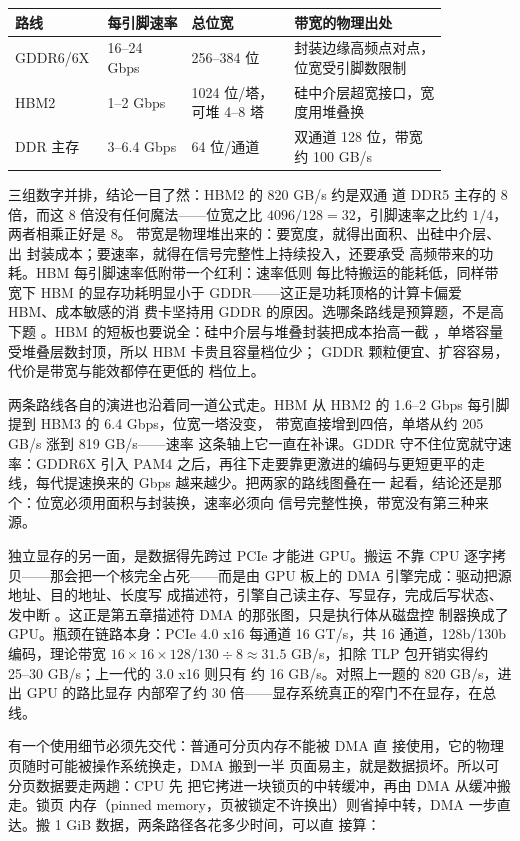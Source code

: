 \begin{longtable}{L{0.13\linewidth}L{0.18\linewidth}L{0.22\linewidth}L{0.33\linewidth}}
\toprule
路线 & 每引脚速率 & 总位宽 & 带宽的物理出处 \\
\midrule
GDDR6/6X & 16--24 Gbps & 256--384 位 & 封装边缘高频点对点，位宽受引脚数限制 \\
HBM2 & 1--2 Gbps & 1024 位/塔，可堆 4--8 塔 & 硅中介层超宽接口，宽度用堆叠换 \\
DDR 主存 & 3--6.4 Gbps & 64 位/通道 & 双通道 128 位，带宽约 100 GB/s \\
\bottomrule
\end{longtable}

三组数字并排，结论一目了然：HBM2 的 820 GB/s 约是双通
道 DDR5 主存的 8 倍，而这 8 倍没有任何魔法——位宽之比
$4096/128=32$，引脚速率之比约 $1/4$，两者相乘正好是 8。
带宽是物理堆出来的：要宽度，就得出面积、出硅中介层、出
封装成本；要速率，就得在信号完整性上持续投入，还要承受
高频带来的功耗。HBM 每引脚速率低附带一个红利：速率低则
每比特搬运的能耗低，同样带宽下 HBM 的显存功耗明显小于
GDDR——这正是功耗顶格的计算卡偏爱 HBM、成本敏感的消
费卡坚持用 GDDR 的原因。选哪条路线是预算题，不是高下题
。HBM 的短板也要说全：硅中介层与堆叠封装把成本抬高一截
，单塔容量受堆叠层数封顶，所以 HBM 卡贵且容量档位少；
GDDR 颗粒便宜、扩容容易，代价是带宽与能效都停在更低的
档位上。

两条路线各自的演进也沿着同一道公式走。HBM 从 HBM2 的
1.6--2 Gbps 每引脚提到 HBM3 的 6.4 Gbps，位宽一塔没变，
带宽直接增到四倍，单塔从约 205 GB/s 涨到 819 GB/s——速率
这条轴上它一直在补课。GDDR 守不住位宽就守速率：GDDR6X
引入 PAM4 之后，再往下走要靠更激进的编码与更短更平的走
线，每代提速换来的 Gbps 越来越少。把两家的路线图叠在一
起看，结论还是那个：位宽必须用面积与封装换，速率必须向
信号完整性换，带宽没有第三种来源。

独立显存的另一面，是数据得先跨过 PCIe 才能进 GPU。搬运
不靠 CPU 逐字拷贝——那会把一个核完全占死——而是由
GPU 板上的 DMA 引擎完成：驱动把源地址、目的地址、长度写
成描述符，引擎自己读主存、写显存，完成后写状态、发中断
。这正是第五章描述符 DMA 的那张图，只是执行体从磁盘控
制器换成了 GPU。瓶颈在链路本身：PCIe 4.0 x16 每通道
16 GT/s，共 16 通道，128b/130b 编码，理论带宽
$16\times16\times128/130\div8\approx31.5$ GB/s，扣除
TLP 包开销实得约 25--30 GB/s；上一代的 3.0 x16 则只有
约 16 GB/s。对照上一题的 820 GB/s，进出 GPU 的路比显存
内部窄了约 30 倍——显存系统真正的窄门不在显存，在总
线。

有一个使用细节必须先交代：普通可分页内存不能被 DMA 直
接使用，它的物理页随时可能被操作系统换走，DMA 搬到一半
页面易主，就是数据损坏。所以可分页数据要走两趟：CPU 先
把它拷进一块锁页的中转缓冲，再由 DMA 从缓冲搬走。锁页
内存（pinned memory，页被锁定不许换出）则省掉中转，DMA
一步直达。搬 1 GiB 数据，两条路径各花多少时间，可以直
接算：

